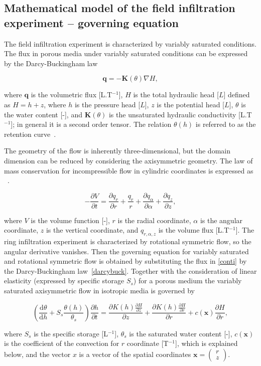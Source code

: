\documentclass[review,times,3p,twocolumn,10pt]{elsarticle}
\newenvironment{lineq}
    {\begin{linenomath*}
    \begin{equation}
    }
    { 
    \end{equation} 
    \end{linenomath*}
    }
\newcommand{\dd}{\mathrm{d}}
\renewcommand{\vec}{\mathbf}
\begin{document}
\subsection{Mathematical model of the field infiltration experiment -- governing equation}%
\label{goveq}


The field infiltration experiment is characterized by variably saturated conditions. The flux in porous media under variably saturated conditions can be expressed by the Darcy-Buckingham law~\citep{buckingham} \begin{lineq}\label{darcybuck}\vec{q} = -\mathbf{K}(\theta) \nabla H,\end{lineq} where $\vec{q}$ is the volumetric flux [L.T$^{-1}$], $H$ is the total hydraulic head [$L$] defined as $H=h+z$, where $h$ is the pressure head [$L$], $z$ is the potential head [$L$], $\theta$ is the water content [-], and $\mathbf{K}(\theta)$ is the unsaturated hydraulic conductivity  [L.T$^{-1}$]; in general it is a  second order tensor. The relation $\theta(h)$ is referred to as the retention curve~\citep{vangenuchten}.

The geometry of the flow is inherently three-dimensional, but the domain dimension can be reduced by considering the axisymmetric geometry. The law of mass conservation  for incompressible flow in cylindric coordinates is expressed as ~\citep{bear1979}.
\begin{lineq}
\label{conti}
-\frac{\partial V}{\partial t} = \frac{\partial q_r}{\partial r} + \frac{q_r}{r} + \frac{\partial q_{\alpha}}{\partial \alpha} + \frac{\partial q_z}{\partial z} ,
\end{lineq}
where $V$ is the volume function [-],  $r$ is the radial coordinate, $\alpha$ is the angular coordinate,  $z$ is the vertical coordinate, and $q_{r, \alpha, z}$ is the  volume flux [L.T$^{-1}$]. The ring infiltration experiment is characterized by rotational symmetric flow, so the angular derivative vanishes. Then the governing equation for  variably saturated and rotational symmetric flow is obtained by substituting the flux in \eqref{conti} by the Darcy-Buckingham law~\eqref{darcybuck}. Together with the consideration of linear elasticity (expressed by specific storage $S_s$) for a porous medium the variably saturated axisymmetric flow in isotropic media is governed by
\begin{lineq}
\label{richaxi}
\left(\frac{\dd \theta}{\dd h} + S_s\frac{\theta(h)}{\theta_s} \right) \frac{\partial h}{\partial t}  =  \frac{\partial K(h) \frac{\partial H}{\partial z}}{\partial z} + \frac{\partial K(h) \frac{\partial H}{\partial r}}{\partial r} + c(\vec{x})\frac{\partial H}{\partial r},
\end{lineq}
where $S_s$ is the specific storage [L$^{-1}$], $\theta_s$ is the saturated water content [-],  $c(\vec{x})$ is the coefficient of the convection for $r$ coordinate [T$^{-1}$], which is explained below, and the vector $x$ is a vector of the spatial coordinates $\vec{x}=\left( \begin{smallmatrix} r \\ z \end{smallmatrix} \right)$.
\end{document}
